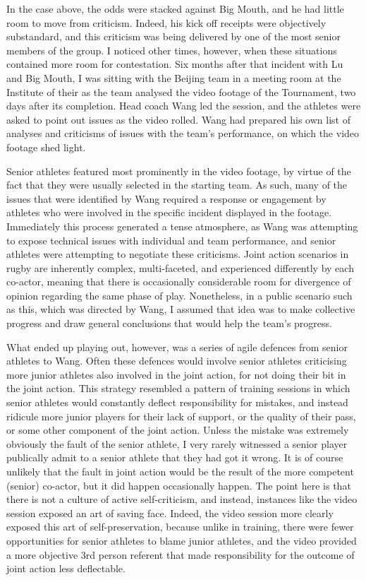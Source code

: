   In the case above, the odds were stacked against Big Mouth, and he had little room to move from criticism.  Indeed, his kick off receipts were objectively substandard, and this criticism was being delivered by one of the most senior members of the group.  I noticed other times, however, when these situations contained more room for contestation.  Six months after that incident with Lu and Big Mouth, I was sitting with the Beijing team in a meeting room at the Institute of their as the team analysed the video footage of the Tournament, two days after its completion.  Head coach Wang led the session, and the athletes were asked to point out issues as the video rolled. Wang had prepared his own list of analyses and criticisms of issues with the team's performance, on which the video footage shed light.

  Senior athletes featured most prominently in the video footage, by virtue of the fact that they were usually selected in the starting team.  As such, many of the issues that were identified by Wang required a response or engagement by athletes who were involved in the specific incident displayed in the footage. Immediately this process generated a tense atmosphere, as Wang was attempting to expose technical issues with individual and team performance, and senior athletes were attempting to negotiate these criticisms.  Joint action scenarios in rugby are inherently complex, multi-faceted, and experienced differently by each co-actor, meaning that there is occasionally considerable room for divergence of opinion regarding the same phase of play. Nonetheless, in a public scenario such as this, which was directed by Wang, I assumed that idea was to make collective progress and draw general conclusions that would help the team's progress.

  What ended up playing out, however, was a series of agile defences from senior athletes to Wang.  Often these defences would involve senior athletes criticising more junior athletes also involved in the joint action, for not doing their bit in the joint action.  This strategy resembled a pattern of training sessions in which senior athletes would constantly deflect responsibility for mistakes, and instead ridicule more junior players for their lack of support, or the quality of their pass, or some other component of the joint action. Unless the mistake was extremely obviously the fault of the senior athlete, I very rarely witnessed a senior player publically admit to a senior athlete that they had got it wrong. It is of course unlikely that the fault in joint action would be the result of the more competent (senior) co-actor, but it did happen occasionally happen.  The point here is that there is not a culture of active self-criticism, and instead, instances like the video session exposed an art of saving face.  Indeed, the video session more clearly exposed this art of self-preservation, because unlike in training, there were fewer opportunities for senior athletes to blame junior athletes, and the video provided a more objective 3rd person referent that made responsibility for the outcome of joint action less deflectable.

